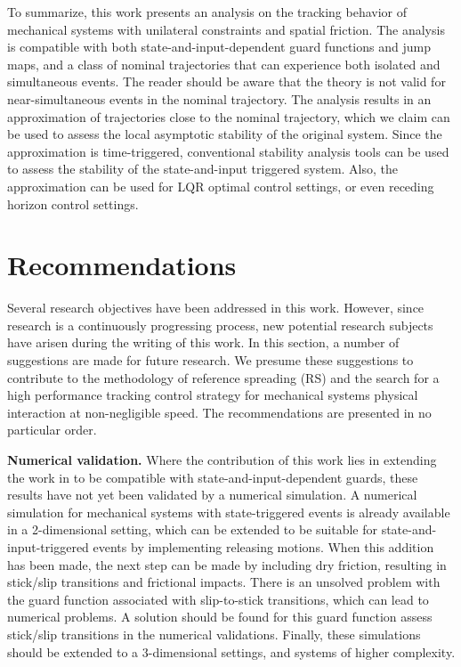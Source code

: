 \documentclass[../DC2017114Bouma.tex]{subfiles}
\begin{document}
To summarize, this work presents an analysis on the tracking behavior of mechanical systems with unilateral constraints and spatial friction. The analysis is compatible with both state-and-input-dependent guard functions and jump maps, and a class of nominal trajectories that can experience both isolated and simultaneous events. The reader should be aware that the theory is not valid for near-simultaneous events in the nominal trajectory. The analysis results in an approximation of trajectories close to the nominal trajectory, which we claim can be used to assess the local asymptotic stability of the original system. Since the approximation is time-triggered, conventional stability analysis tools can be used to assess the stability of the state-and-input triggered system. Also, the approximation can be used for LQR optimal control settings, or even receding horizon control settings.

\section{Recommendations}\label{sec:6rec}
Several research objectives have been addressed in this work. However, since research is a continuously progressing process, new potential research subjects have arisen during the writing of this work. In this section, a number of suggestions are made for future research. We presume these suggestions to contribute to the methodology of reference spreading (RS) and the search for a high performance tracking control strategy for mechanical systems physical interaction at non-negligible speed. The recommendations are presented in no particular order.

\textbf{Numerical validation.} Where the contribution of this work lies in extending the work in \cite{Rijnen2018a} to be compatible with state-and-input-dependent guards, these results have not yet been validated by a numerical simulation. A numerical simulation for mechanical systems with state-triggered events is already available in a 2-dimensional setting, which can be extended to be suitable for state-and-input-triggered events by implementing releasing motions. When this addition has been made, the next step can be made by including dry friction, resulting in stick/slip transitions and frictional impacts. There is an unsolved problem with the guard function associated with slip-to-stick transitions, which can lead to numerical problems. A solution should be found for this guard function assess stick/slip transitions in the numerical validations. Finally, these simulations should be extended to a 3-dimensional settings, and systems of higher complexity.
\end{document}
